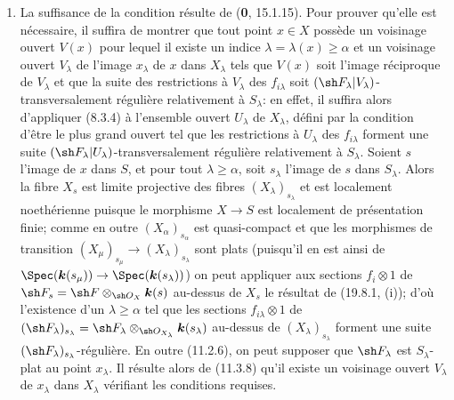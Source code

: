 \begin{enumerate}
  \item[(i)] La suffisance de la condition résulte de (\textbf{0}, 15.1.15). Pour prouver qu'elle est nécessaire, il suffira de montrer que tout point $x\in X$ possède un voisinage ouvert $V(x)$ pour lequel il existe un indice $\lambda=\lambda(x)\geq\alpha$ et un voisinage ouvert $V_\lambda$ de l'image $x_\lambda$ de $x$ dans $X_\lambda$ tels que $V(x)$ soit l'image réciproque de $V_\lambda$ et que la suite des restrictions à $V_\lambda$ des $f_{i\lambda}$ soit $(\sh F_\lambda|V_\lambda)$-transversalement régulière relativement à $S_\lambda$: en effet, il suffira alors d'appliquer (8.3.4) à l'ensemble ouvert $U_\lambda$ de $X_\lambda$, défini par la condition d'être le plus grand ouvert tel que les restrictions à $U_\lambda$ des $f_{i\lambda}$ forment une suite $(\sh F_\lambda|U_\lambda)$-transversalement régulière relativement à $S_\lambda$.
  Soient $s$ l'image de $x$ dans $S$, et pour tout $\lambda\geq\alpha$, soit $s_\lambda$ l'image de $s$ dans $S_\lambda$. Alors la fibre $X_s$ est limite projective des fibres $(X_\lambda)_{s_\lambda}$ et est localement noethérienne puisque le morphisme $X\to S$ est localement de présentation finie; comme en outre $(X_\alpha)_{s_\alpha}$ est quasi-compact et que les morphismes de transition $(X_\mu)_{s_\mu}\to(X_\lambda)_{s_\lambda}$ sont plats (puisqu'il en est ainsi de $\Spec(\boldsymbol{k}(s_\mu))\to\Spec(\boldsymbol{k}(s_\lambda))$) on peut appliquer aux sections $f_i\otimes1$ de $\sh F_s=\sh F\otimes_{\sh O_X}\boldsymbol{k}(s)$ au-dessus de $X_s$ le résultat de (19.8.1, (i)); d'où l'existence d'un $\lambda\geq\alpha$ tel que les sections $f_{i\lambda}\otimes1$ de $(\sh F_\lambda)_{s_\lambda}=\sh F_\lambda\otimes_{\sh O_{X_\lambda}}\boldsymbol{k}(s_\lambda)$ au-dessus de $(X_\lambda)_{s_\lambda}$ forment une suite $(\sh F_\lambda)_{s_\lambda}$-régulière. En outre (11.2.6), on peut supposer que $\sh F_\lambda$ est $S_\lambda$-plat au point $x_\lambda$. Il résulte alors de (11.3.8) qu'il existe un voisinage ouvert $V_\lambda$ de $x_\lambda$ dans $X_\lambda$ vérifiant les conditions requises.


\end{enumerate}
